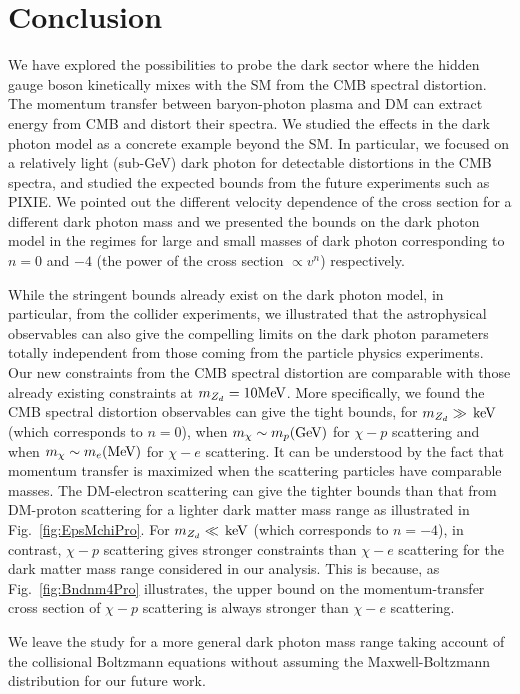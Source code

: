 \documentclass[5p,times]{elsarticle}
\newcommand\kev{\,{\rm keV}}
\begin{document}
{\section{Conclusion}
\label{Conclusion}
We have explored the possibilities to probe the dark sector where the hidden gauge boson kinetically mixes with the SM from the CMB spectral distortion. 
The momentum transfer between baryon-photon plasma and DM can extract energy from CMB and distort their spectra. We studied the effects in the dark photon model as a concrete example beyond the SM. In particular, we focused on a relatively light (sub-GeV) dark photon for detectable distortions in the CMB spectra, and studied the expected bounds from the future experiments such as PIXIE. We pointed out the different velocity dependence of the cross section for a different dark photon mass and we presented the bounds on the dark photon model in the regimes for large and small masses of dark photon corresponding to $n=0$ and $-4$ (the power of the cross section $\propto v^n$) respectively.

  While the stringent bounds already exist on the dark photon model, in particular, from the collider experiments, we illustrated that the astrophysical observables can also give the compelling limits on the dark photon parameters totally independent from those coming from the particle physics experiments. Our new constraints from the CMB spectral distortion are comparable with those already existing constraints at $m_{Z_d}= 10 \rm MeV$. More specifically, we found the CMB spectral distortion observables can give the tight bounds, for $m_{Z_d}\gg \kev$ (which corresponds to $n=0$), when $m_\chi\sim m_p (\rm GeV)$ for $\chi-p$ scattering and when $m_\chi\sim m_e (\rm MeV)$ for $\chi-e$ scattering. It can be understood by the fact that momentum transfer is maximized when the scattering particles have comparable masses. The DM-electron scattering can give the tighter bounds than that from DM-proton scattering for a lighter dark matter mass range as illustrated in Fig.~\ref{fig:EpsMchiPro}.  For $m_{Z_d}\ll \kev$ (which corresponds to $n=-4$), in contrast, $\chi-p$ scattering gives stronger constraints than $\chi-e$ scattering for the dark matter mass range considered in our analysis. This is because, as Fig.~\ref{fig:Bndnm4Pro} illustrates, the upper bound on the momentum-transfer cross section of $\chi-p$ scattering is always stronger than $\chi-e$ scattering.


We leave the study for a more general dark photon mass range taking account of the collisional Boltzmann equations without assuming the Maxwell-Boltzmann distribution for our future work. 
 

}
\end{document}
